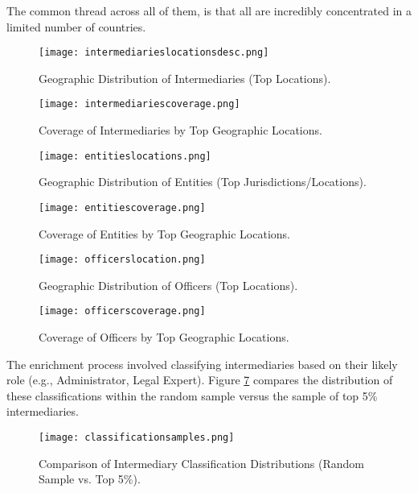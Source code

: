 The common thread across all of them, is that all are incredibly concentrated in a limited number of countries.

\begin{figure}[htbp]
    \centering
    \texttt{[image: intermediarieslocationsdesc.png]}
    \caption{Geographic Distribution of Intermediaries (Top Locations).}
    \label{fig:int_locations}
\end{figure}

\begin{figure}[htbp]
    \centering
    \texttt{[image: intermediariescoverage.png]}
    \caption{Coverage of Intermediaries by Top Geographic Locations.}
    \label{fig:int_coverage}
\end{figure}

\begin{figure}[htbp]
    \centering
    \texttt{[image: entitieslocations.png]}
    \caption{Geographic Distribution of Entities (Top Jurisdictions/Locations).}
    \label{fig:ent_locations}
\end{figure}

\begin{figure}[htbp]
    \centering
    \texttt{[image: entitiescoverage.png]}
    \caption{Coverage of Entities by Top Geographic Locations.}
    \label{fig:ent_coverage}
\end{figure}

\begin{figure}[htbp]
    \centering
    \texttt{[image: officerslocation.png]}
    \caption{Geographic Distribution of Officers (Top Locations).}
    \label{fig:off_locations}
\end{figure}

\begin{figure}[htbp]
    \centering
    \texttt{[image: officerscoverage.png]}
    \caption{Coverage of Officers by Top Geographic Locations.}
    \label{fig:off_coverage}
\end{figure}

The enrichment process involved classifying intermediaries based on their likely role (e.g., Administrator, Legal Expert). Figure \ref{fig:classification_samples} compares the distribution of these classifications within the random sample versus the sample of top 5\% intermediaries.

\begin{figure}[htbp]
    \centering
    \texttt{[image: classificationsamples.png]}
    \caption{Comparison of Intermediary Classification Distributions (Random Sample vs. Top 5\%).}
    \label{fig:classification_samples}
\end{figure}

